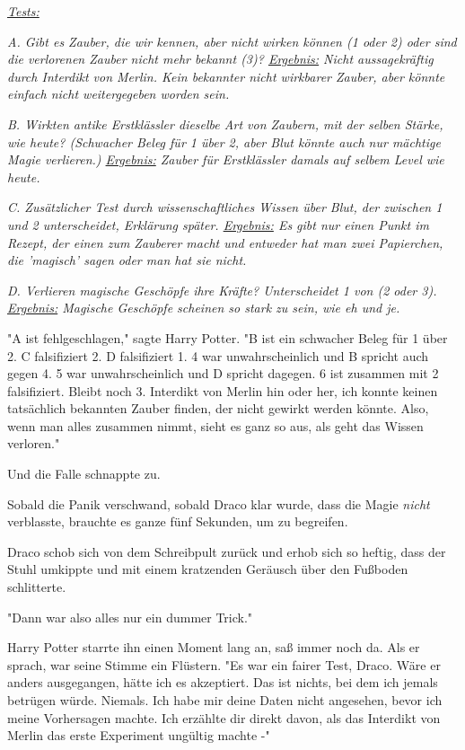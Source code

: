{\emph{\uline{Tests:}}

\emph{A. Gibt es Zauber, die wir kennen, aber nicht wirken können (1 oder 2) oder sind die verlorenen Zauber nicht mehr bekannt (3)? \uline{Ergebnis:} Nicht aussagekräftig durch Interdikt von Merlin. Kein bekannter nicht wirkbarer Zauber, aber könnte einfach nicht weitergegeben worden sein.}

\emph{B. Wirkten antike Erstklässler dieselbe Art von Zaubern, mit der selben Stärke, wie heute? (Schwacher Beleg für 1 über 2, aber Blut könnte auch nur mächtige Magie verlieren.) \uline{Ergebnis:} Zauber für Erstklässler damals auf selbem Level wie heute.}

\emph{C. Zusätzlicher Test durch wissenschaftliches Wissen über Blut, der zwischen 1 und 2 unterscheidet, Erklärung später. \uline{Ergebnis:} Es gibt nur einen Punkt im Rezept, der einen zum Zauberer macht und entweder hat man zwei Papierchen, die 'magisch' sagen oder man hat sie nicht.}

\emph{D. Verlieren magische Geschöpfe ihre Kräfte? Unterscheidet 1 von (2 oder 3). \uline{Ergebnis:} Magische Geschöpfe scheinen so stark zu sein, wie eh und je.}

"A ist fehlgeschlagen," sagte Harry Potter. "B ist ein schwacher Beleg für 1 über 2. C falsifiziert 2. D falsifiziert 1. 4 war unwahrscheinlich und B spricht auch gegen 4. 5 war unwahrscheinlich und D spricht dagegen. 6 ist zusammen mit 2 falsifiziert. Bleibt noch 3. Interdikt von Merlin hin oder her, ich konnte keinen tatsächlich bekannten Zauber finden, der nicht gewirkt werden könnte. Also, wenn man alles zusammen nimmt, sieht es ganz so aus, als geht das Wissen verloren."

Und die Falle schnappte zu.

Sobald die Panik verschwand, sobald Draco klar wurde, dass die Magie \emph{nicht} verblasste, brauchte es ganze fünf Sekunden, um zu begreifen.

Draco schob sich von dem Schreibpult zurück und erhob sich so heftig, dass der Stuhl umkippte und mit einem kratzenden Geräusch über den Fußboden schlitterte.

"Dann war also alles nur ein dummer Trick."

Harry Potter starrte ihn einen Moment lang an, saß immer noch da. Als er sprach, war seine Stimme ein Flüstern. "Es war ein fairer Test, Draco. Wäre er anders ausgegangen, hätte ich es akzeptiert. Das ist nichts, bei dem ich jemals betrügen würde. Niemals. Ich habe mir deine Daten nicht angesehen, bevor ich meine Vorhersagen machte. Ich erzählte dir direkt davon, als das Interdikt von Merlin das erste Experiment ungültig machte -"

}
